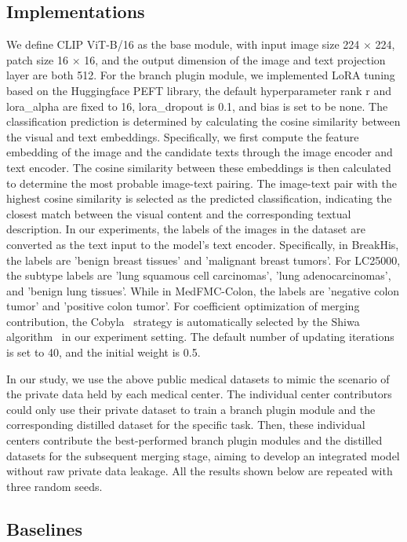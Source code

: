 \subsection{Implementations}
We define CLIP ViT-B/16 as the base module, with input image size 224 ${\times}$ 224, patch size 16 ${\times}$ 16, and the output dimension of the image and text projection layer are both 512. For the branch plugin module, we implemented LoRA tuning based on the Huggingface PEFT library, the default hyperparameter rank r and lora\_alpha are fixed to 16, lora\_dropout is 0.1, and bias is set to be none.
The classification prediction is determined by calculating the cosine similarity between the visual and text embeddings. Specifically, we first compute the feature embedding of the image and the candidate texts through the image encoder and text encoder. The cosine similarity between these embeddings is then calculated to determine the most probable image-text pairing. The image-text pair with the highest cosine similarity is selected as the predicted classification, indicating the closest match between the visual content and the corresponding textual description.
In our experiments, the labels of the images in the dataset are converted as the text input to the model's text encoder. Specifically, in BreakHis, the labels are 'benign breast tissues' and 'malignant breast tumors'. For LC25000, the subtype labels are 'lung squamous cell carcinomas', 'lung adenocarcinomas', and 'benign lung tissues'. While in MedFMC-Colon, the labels are 'negative colon tumor' and 'positive colon tumor'.
For coefficient optimization of merging contribution, the Cobyla~\cite{powell1994direct} strategy is automatically selected by the Shiwa algorithm~\cite{liu2020versatile} in our experiment setting. The default number of updating iterations is set to 40, and the initial weight is 0.5.

In our study, we use the above public medical datasets to mimic the scenario of the private data held by each medical center. The individual center contributors could only use their private dataset to train a branch plugin module and the corresponding distilled dataset for the specific task. Then, these individual centers contribute the best-performed branch plugin modules and the distilled datasets for the subsequent merging stage, aiming to develop an integrated model without raw private data leakage. All the results shown below are repeated with three random seeds.


\subsection{Baselines}

